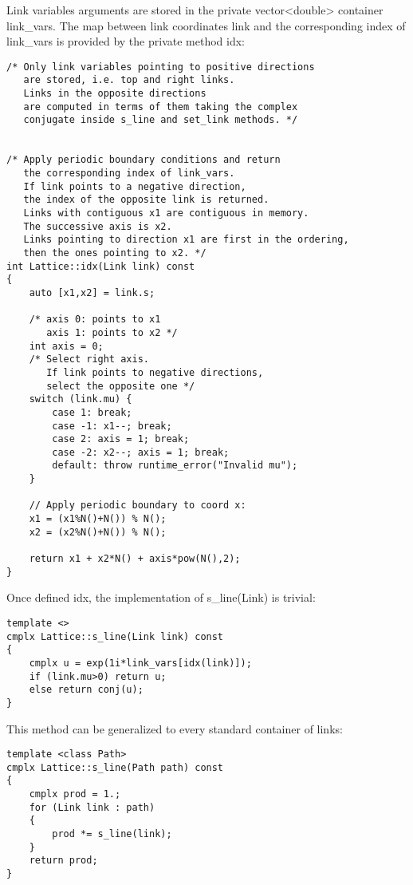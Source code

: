 Link variables arguments are stored in the private {\ttfamily vector<double>} container {\ttfamily link\_vars}.
The map between link coordinates {\ttfamily link} and the corresponding index of {\ttfamily link\_vars} is provided by the private method {\ttfamily idx}:
\begin{lstlisting}[caption={Link indexing}]
/* Only link variables pointing to positive directions
   are stored, i.e. top and right links.
   Links in the opposite directions
   are computed in terms of them taking the complex
   conjugate inside s_line and set_link methods. */


/* Apply periodic boundary conditions and return
   the corresponding index of link_vars.
   If link points to a negative direction,
   the index of the opposite link is returned.
   Links with contiguous x1 are contiguous in memory.
   The successive axis is x2.
   Links pointing to direction x1 are first in the ordering,
   then the ones pointing to x2. */
int Lattice::idx(Link link) const
{
    auto [x1,x2] = link.s;
    
    /* axis 0: points to x1
       axis 1: points to x2 */
    int axis = 0;
    /* Select right axis.
       If link points to negative directions,
       select the opposite one */
    switch (link.mu) {
        case 1: break;
        case -1: x1--; break;
        case 2: axis = 1; break;
        case -2: x2--; axis = 1; break;
        default: throw runtime_error("Invalid mu");
    }

    // Apply periodic boundary to coord x:
    x1 = (x1%N()+N()) % N();
    x2 = (x2%N()+N()) % N();
    
    return x1 + x2*N() + axis*pow(N(),2);
}
\end{lstlisting}

Once defined {\ttfamily idx}, the implementation of {\ttfamily s\_line(Link)} is trivial:
\begin{lstlisting}[caption={Link Schwinger line}]
template <>
cmplx Lattice::s_line(Link link) const
{
    cmplx u = exp(1i*link_vars[idx(link)]);
    if (link.mu>0) return u;
    else return conj(u);
}
\end{lstlisting}

This method can be generalized to every standard container of links:
\begin{lstlisting}[caption={Generic path Schwinger line}]
template <class Path>
cmplx Lattice::s_line(Path path) const
{
    cmplx prod = 1.;
    for (Link link : path)
    {
        prod *= s_line(link);
    }
    return prod;
}
\end{lstlisting}

